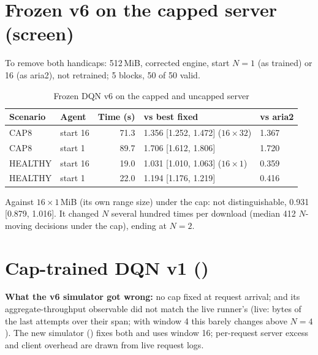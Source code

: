 \section{Frozen v6 on the capped server (screen)}
To remove both handicaps: 512\,MiB, corrected engine, start $N=1$ (as trained) or 16 (as aria2), not retrained; 5 blocks, 50 of 50 valid.
\begin{table}[H]\centering\small
\caption{Frozen DQN v6 on the capped and uncapped server}\label{tab:v6cap}
\begin{tabular}{@{}llrll@{}}
\toprule
\textbf{Scenario} & \textbf{Agent} & \textbf{Time (s)} & \textbf{vs best fixed} & \textbf{vs aria2}\\
\midrule
CAP8 & start 16 & 71.3 & 1.356 [1.252, 1.472] ($16\times32$) & 1.367\\
CAP8 & start 1 & 89.7 & 1.706 [1.612, 1.806] & 1.720\\
HEALTHY & start 16 & 19.0 & 1.031 [1.010, 1.063] ($16\times1$) & 0.359\\
HEALTHY & start 1 & 22.0 & 1.194 [1.176, 1.219] & 0.416\\
\bottomrule
\end{tabular}
\end{table}
Against $16\times1$\,MiB (its own range size) under the cap: not distinguishable, 0.931 [0.879, 1.016]. It changed $N$ several hundred times per download (median 412 $N$-moving decisions under the cap), ending at $N=2$.

\section{Cap-trained DQN v1 ()}
\textbf{What the v6 simulator got wrong:} no cap fixed at request arrival; and its aggregate-throughput observable did not match the live runner's (live: bytes of the last  attempts over their span; with window 4 this barely changes above $N=4$). The new simulator () fixes both and uses window 16; per-request server excess and client overhead are drawn from live request logs.

